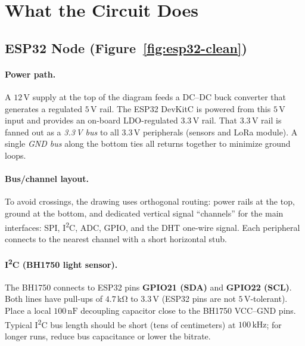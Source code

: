 \documentclass[12pt,onecolumn]{IEEEtran} %
\begin{document}
\fi



\section*{What the Circuit Does}

\subsection*{ESP32 Node (Figure~\ref{fig:esp32-clean})}

\paragraph{Power path.}
A $12\,\mathrm{V}$ supply at the top of the diagram feeds a DC--DC buck converter that generates a regulated $5\,\mathrm{V}$ rail.  
The ESP32 DevKitC is powered from this $5\,\mathrm{V}$ input and provides an on-board LDO-regulated $3.3\,\mathrm{V}$ rail.  
That $3.3\,\mathrm{V}$ rail is fanned out as a \emph{3.3\,V bus} to all $3.3\,\mathrm{V}$ peripherals (sensors and LoRa module).  
A single \emph{GND bus} along the bottom ties all returns together to minimize ground loops.

\paragraph{Bus/channel layout.}
To avoid crossings, the drawing uses orthogonal routing: power rails at the top, ground at the bottom, and dedicated vertical
signal ``channels'' for the main interfaces:
SPI, I\textsuperscript{2}C, ADC, GPIO, and the DHT one-wire signal.  
Each peripheral connects to the nearest channel with a short horizontal stub.

\paragraph{I\textsuperscript{2}C (BH1750 light sensor).}
The BH1750 connects to ESP32 pins \textbf{GPIO21 (SDA)} and \textbf{GPIO22 (SCL)}.  
Both lines have pull-ups of $4.7\,\mathrm{k\Omega}$ to $3.3\,\mathrm{V}$ (ESP32 pins are not $5\,\mathrm{V}$-tolerant).  
Place a local $100\,\mathrm{nF}$ decoupling capacitor close to the BH1750 VCC--GND pins.  
Typical I\textsuperscript{2}C bus length should be short (tens of centimeters) at $100\,\mathrm{kHz}$; for longer runs, reduce
bus capacitance or lower the bitrate.
\end{document}
